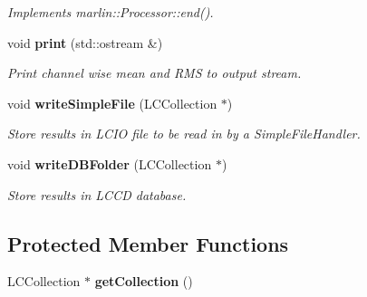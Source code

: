 \begin{DoxyCompactItemize}
\begin{DoxyCompactList}\small\item\em Implements marlin::Processor::end(). \item\end{DoxyCompactList}\item 
void {\bf print} (std::ostream \&)\label{classCALICE_1_1ExtractConfigurationAverageProcessor_a6c7e3795c5dce5f4430a3fe53a577ff4}

\begin{DoxyCompactList}\small\item\em Print channel wise mean and RMS to output stream. \item\end{DoxyCompactList}\item 
void {\bf writeSimpleFile} (LCCollection $\ast$)\label{classCALICE_1_1ExtractConfigurationAverageProcessor_a6a64edef52110005a069deafdadabb30}

\begin{DoxyCompactList}\small\item\em Store results in LCIO file to be read in by a SimpleFileHandler. \item\end{DoxyCompactList}\item 
void {\bf writeDBFolder} (LCCollection $\ast$)\label{classCALICE_1_1ExtractConfigurationAverageProcessor_ad81f6e7290071ff7ad46f62a268b05a9}

\begin{DoxyCompactList}\small\item\em Store results in LCCD database. \item\end{DoxyCompactList}\end{DoxyCompactItemize}
\subsection*{Protected Member Functions}
\begin{DoxyCompactItemize}
\item 
LCCollection $\ast$ {\bfseries getCollection} ()\label{classCALICE_1_1ExtractConfigurationAverageProcessor_a723f985ee753e55a96b5a1d484e91769}

\end{DoxyCompactItemize}
